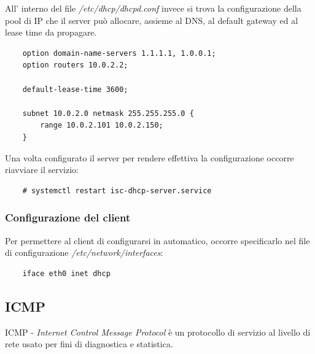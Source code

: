 All' interno del file \emph{/etc/dhcp/dhcpd.conf} invece si trova la configurazione della pool di IP che il server può allocare, assieme al DNS, al default gateway ed al lease time da propagare.
\begin{verbatim}
    option domain-name-servers 1.1.1.1, 1.0.0.1;
    option routers 10.0.2.2;
    
    default-lease-time 3600;
    
    subnet 10.0.2.0 netmask 255.255.255.0 {
        range 10.0.2.101 10.0.2.150;
    }
\end{verbatim}

Una volta configurato il server per rendere effettiva la configurazione occorre riavviare il servizio:
\begin{verbatim}
    # systemctl restart isc-dhcp-server.service
\end{verbatim}

\subsubsection{Configurazione del client}
Per permettere al client di configurarsi in automatico, occorre specificarlo nel file di configurazione \emph{/etc/network/interfaces}:
\begin{verbatim}
    iface eth0 inet dhcp
\end{verbatim}

\subsection{ICMP}
ICMP - \emph{Internet Control Message Protocol} è un protocollo di servizio al livello di rete usato per fini di diagnostica e statistica.

